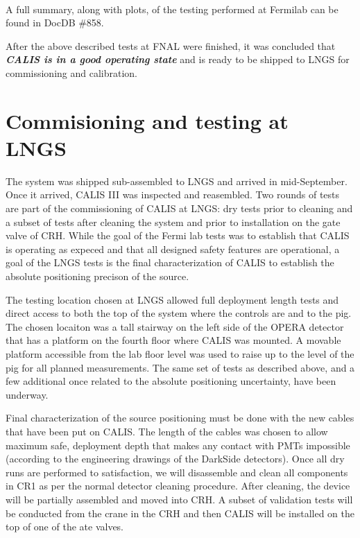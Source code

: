  \paragraph{}
  A full summary, along with plots, of the testing performed at Fermilab can be found in DocDB \#858.  

After the above described tests at FNAL were finished, it was concluded that \textit{\bf CALIS is in a good operating state} and is ready to be shipped to LNGS for commissioning and calibration.


\section{Commisioning and testing at LNGS}

 The system was shipped sub-assembled to LNGS and arrived in mid-September. Once it arrived, CALIS III was inspected and reasembled. Two rounds of tests are part of the commissioning of CALIS at LNGS: dry tests prior to cleaning and a subset of tests after cleaning the system and prior to installation on the gate valve of CRH. While the goal of the Fermi lab tests was to establish that CALIS is operating as expeced and that all designed safety features are operational, a  goal of the LNGS tests is the final characterization of CALIS to establish the absolute positioning precison of the source. 

The testing location chosen at LNGS allowed full deployment length tests and direct access to both the top of the system where the controls are and to the pig. The chosen locaiton was a tall stairway on the left side of the OPERA detector that has a platform on the fourth floor where CALIS was mounted. A movable platform accessible from the lab floor level was used to raise up to the level of the pig for all planned measurements.   The same set of tests as described above, and a few additional once related to the absolute positioning uncertainty,  have been underway.

 Final characterization of the source positioning must be done with the new cables that have been put on CALIS. The length of the cables was chosen to allow maximum safe, deployment depth that makes any contact with PMTs impossible (according to the engineering drawings of the DarkSide detectors).   Once all dry runs are performed to satisfaction, we will disassemble and clean all components in CR1 as per the normal detector cleaning procedure. After cleaning, the device will be partially assembled and moved into CRH. A subset of validation tests will be conducted from the crane in the CRH and then CALIS will be installed on the top of one of the ate valves.

